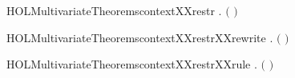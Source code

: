 \newcommand{\HOLMultivariateTheoremscontextXXrelabXXrule}{\UseVerbatim{HOLMultivariateTheoremscontextXXrelabXXrule}}
\begin{SaveVerbatim}{HOLMultivariateTheoremscontextXXrestr}
\HOLTokenTurnstile{} \HOLSymConst{\HOLTokenForall{}}  .   \ensuremath{(}  \ensuremath{)} \HOLSymConst{\HOLTokenImp{}}   
\end{SaveVerbatim}
\newcommand{\HOLMultivariateTheoremscontextXXrestr}{\UseVerbatim{HOLMultivariateTheoremscontextXXrestr}}
\begin{SaveVerbatim}{HOLMultivariateTheoremscontextXXrestrXXrewrite}
\HOLTokenTurnstile{} \HOLSymConst{\HOLTokenForall{}}  .   \ensuremath{(}  \ensuremath{)} \HOLSymConst{\HOLTokenEquiv{}}   
\end{SaveVerbatim}
\newcommand{\HOLMultivariateTheoremscontextXXrestrXXrewrite}{\UseVerbatim{HOLMultivariateTheoremscontextXXrestrXXrewrite}}
\begin{SaveVerbatim}{HOLMultivariateTheoremscontextXXrestrXXrule}
\HOLTokenTurnstile{} \HOLSymConst{\HOLTokenForall{}}  .    \HOLSymConst{\HOLTokenImp{}}   \ensuremath{(}  \ensuremath{)}
\end{SaveVerbatim}
\newcommand{\HOLMultivariateTheoremscontextXXrestrXXrule}{\UseVerbatim{HOLMultivariateTheoremscontextXXrestrXXrule}}
